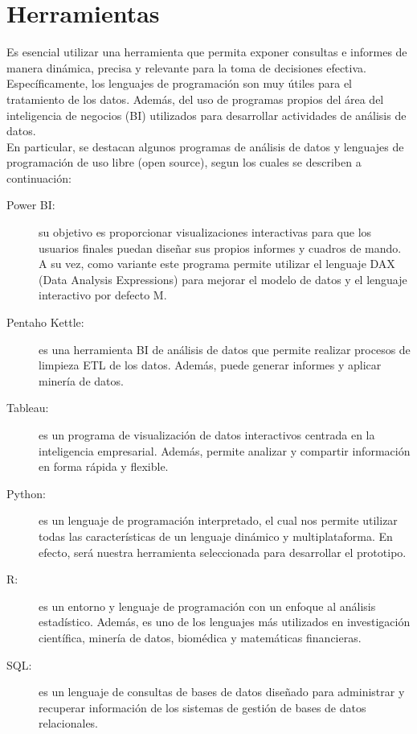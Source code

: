 \documentclass[11pt,titlepage]{report}
\begin{document}

\section{Herramientas}

Es esencial utilizar una herramienta que permita exponer consultas e informes de manera dinámica, precisa y relevante para la toma de decisiones efectiva. Específicamente, los lenguajes de programación son muy útiles para el tratamiento de los datos. Además, del uso de programas propios del área del inteligencia de negocios (BI) utilizados para desarrollar actividades de análisis de datos.\\

 En particular, se destacan algunos programas de análisis de datos y lenguajes de programación de uso libre (open source), segun \cite{web00} los cuales se describen a continuación:

\begin{description}
\item[Power BI: ] su objetivo es proporcionar visualizaciones interactivas para que los usuarios finales puedan diseñar sus propios informes y cuadros de mando. A su vez, como variante este programa permite utilizar el lenguaje DAX (Data Analysis Expressions) para mejorar el modelo de datos y el lenguaje interactivo por defecto M.

\item[Pentaho Kettle: ] es una herramienta BI de análisis de datos que permite realizar procesos de limpieza ETL de los datos. Además, puede generar informes y aplicar minería de datos.

\item[Tableau: ] es un programa de visualización de datos interactivos centrada en la inteligencia empresarial. Además, permite analizar y compartir información en forma rápida y flexible.


\item[Python: ] es un lenguaje de programación interpretado, el cual nos permite utilizar todas las características de un lenguaje dinámico y multiplataforma. En efecto, será nuestra herramienta seleccionada para desarrollar el prototipo.

\item[R: ] es un entorno y lenguaje de programación con un enfoque al análisis estadístico. Además, es uno de los lenguajes más utilizados en investigación científica, minería de datos, biomédica y matemáticas financieras.

\item[SQL: ] es un lenguaje de consultas de bases de datos diseñado para administrar y recuperar información de los sistemas de gestión de bases de datos relacionales.\\ 

\end{description}
\end{document}
